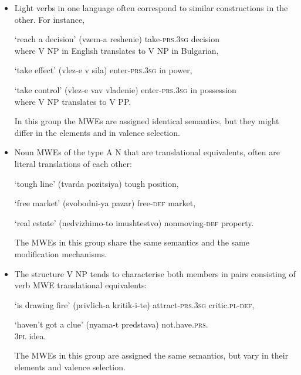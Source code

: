 \documentclass[output=paper]{langsci/langscibook}
\begin{document}
\begin{itemize}
\item Light verbs in one language often correspond to similar constructions
in the other. For instance,

\osenovaitem `reach a decision'  \textit{}  (vzem-a reshenie) take-\textsc{prs.3sg} decision\\ where V NP
in English translates to V NP in Bulgarian,

\osenovaitem `take effect'  \textit{}  (vlez-e v sila)  enter-\textsc{prs.3sg} in power, 

\osenovaitem `take control' \textit{} (vlez-e vav vladenie) enter-\textsc{prs.3sg}  in possession\\
where V NP translates to V PP.

In this group the MWEs are assigned identical semantics, but they might
differ in the elements and in valence selection.

\item Noun MWEs of the type A N that are translational equivalents, often are literal translations of each other:

\osenovaitem `tough line' \textit{}  (tvarda pozitsiya) tough position,

\osenovaitem `free market' \textit{}  (svobodni-ya pazar) free-\textsc{def} market,

\osenovaitem `real estate' \textit{}  (nedvizhimo-to imushtestvo) nonmoving-\textsc{def} property.

The MWEs in this group share the same semantics and the same modification mechanisms.

\item The structure V NP tends to characterise both members in pairs consisting of verb MWE translational equivalents:

\osenovaitem `is drawing fire' \textit{} (privlich-a kritik-i-te) attract-\textsc{prs.3sg} critic.\textsc{pl-def},

\osenovaitem `haven't got a clue'  \textit{}  (nyama-t predstava) not.have.\textsc{prs.\\3pl} idea.

The MWEs in this group are assigned the same semantics, but vary in their elements and valence selection.
\end{itemize}
\end{document}
